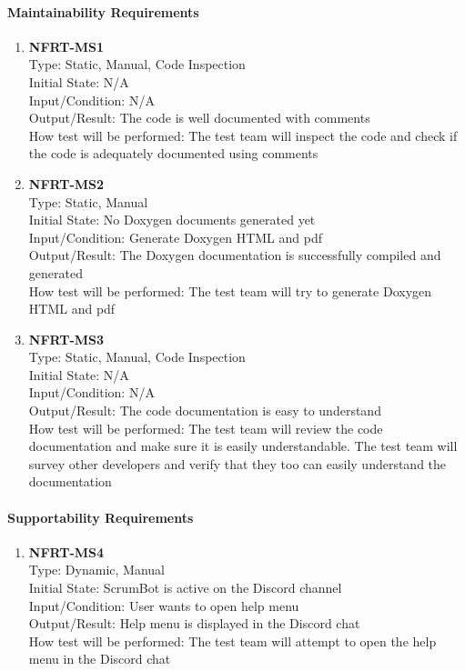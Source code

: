 \documentclass[12pt, titlepage]{article}
\begin{document}
\paragraph{Maintainability Requirements}
\begin{enumerate}

\item{\textbf{NFRT-MS1}}\\
Type: Static, Manual, Code Inspection\\
Initial State: N/A\\
Input/Condition: N/A\\
Output/Result: The code is well documented with comments\\
How test will be performed: The test team will inspect the code and check if the code is adequately documented using comments
\item{\textbf{NFRT-MS2}}\\
Type: Static, Manual\\
Initial State: No Doxygen documents generated yet\\
Input/Condition: Generate Doxygen HTML and pdf\\
Output/Result: The Doxygen documentation is successfully compiled and generated\\
How test will be performed: The test team will try to generate Doxygen HTML and pdf
\item{\textbf{NFRT-MS3}}\\
Type: Static, Manual, Code Inspection\\
Initial State: N/A\\
Input/Condition: N/A\\
Output/Result: The code documentation is easy to understand\\
How test will be performed: The test team will review the code documentation and make sure it is easily understandable. The test team will survey other developers and verify that they too can easily understand the documentation
\end{enumerate}

\paragraph{Supportability Requirements}
\begin{enumerate}

\item{\textbf{NFRT-MS4}}\\
Type: Dynamic, Manual\\
Initial State: ScrumBot is active on the Discord channel\\
Input/Condition: User wants to open help menu\\
Output/Result: Help menu is displayed in the Discord chat\\
How test will be performed: The test team will attempt to open the help menu in the Discord chat
\end{enumerate}
\end{document}

